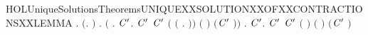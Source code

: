 \begin{SaveVerbatim}{HOLUniqueSolutionsTheoremsUNIQUEXXSOLUTIONXXOFXXCONTRACTIONSXXLEMMA}
\HOLTokenTurnstile{} \HOLSymConst{\HOLTokenForall{}} .
       \ensuremath{(}\HOLSymConst{\HOLTokenExists{}}.   \HOLSymConst{\HOLTokenConj{}}     \HOLSymConst{\HOLTokenConj{}}    \ensuremath{)} \HOLSymConst{\HOLTokenImp{}}
       \HOLSymConst{\HOLTokenForall{}}.
             \HOLSymConst{\HOLTokenImp{}}
           \ensuremath{(}\HOLSymConst{\HOLTokenForall{}} .
                  \HOLTokenWeakTransBegin{} \HOLTokenWeakTransEnd {} \HOLSymConst{\HOLTokenImp{}}
                \HOLSymConst{\HOLTokenExists{}}\ensuremath{\HOLBoundVar{C}\sp{\prime}}.
                     \ensuremath{\HOLBoundVar{C}\sp{\prime}} \HOLSymConst{\HOLTokenConj{}}   \ensuremath{\HOLBoundVar{C}\sp{\prime}}  \HOLSymConst{\HOLTokenConj{}}
                    \ensuremath{(}  \ensuremath{(}\HOLTokenLambda{} .  \HOLTokenWeakTransBegin{} \HOLTokenWeakTransEnd {}\ensuremath{)}\ensuremath{)} \ensuremath{(} \ensuremath{)}
                      \ensuremath{(}\ensuremath{\HOLBoundVar{C}\sp{\prime}} \ensuremath{)}\ensuremath{)} \HOLSymConst{\HOLTokenConj{}}
           \HOLSymConst{\HOLTokenForall{}}.
                 \HOLTokenWeakTransBegin\HOLConst{\ensuremath{\tau}}\HOLTokenWeakTransEnd {} \HOLSymConst{\HOLTokenImp{}}
               \HOLSymConst{\HOLTokenExists{}}\ensuremath{\HOLBoundVar{C}\sp{\prime}}.
                    \ensuremath{\HOLBoundVar{C}\sp{\prime}} \HOLSymConst{\HOLTokenConj{}}   \ensuremath{\HOLBoundVar{C}\sp{\prime}}  \HOLSymConst{\HOLTokenConj{}}
                   \ensuremath{(}  \ensuremath{)} \ensuremath{(} \ensuremath{)} \ensuremath{(}\ensuremath{\HOLBoundVar{C}\sp{\prime}} \ensuremath{)}
\end{SaveVerbatim}
\newcommand{\HOLUniqueSolutionsTheoremsUNIQUEXXSOLUTIONXXOFXXCONTRACTIONSXXLEMMA}{\UseVerbatim{HOLUniqueSolutionsTheoremsUNIQUEXXSOLUTIONXXOFXXCONTRACTIONSXXLEMMA}}
